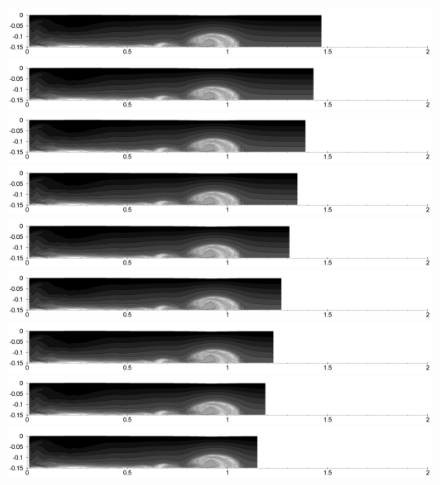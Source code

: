 \begin{figure}[htbp]
  \begin{center}    \includegraphics[scale=0.35]{../figures/Exp3-CASE1-dt0.005/rec_2_buf_24_sub_10/D2-101.pdf}
\includegraphics[scale=0.35]{../figures/Exp3-CASE1-dt0.005/rec_2_buf_24_sub_10/D2-102.pdf}    \includegraphics[scale=0.35]{../figures/Exp3-CASE1-dt0.005/rec_2_buf_24_sub_10/D2-103.pdf}
\includegraphics[scale=0.35]{../figures/Exp3-CASE1-dt0.005/rec_2_buf_24_sub_10/D2-104.pdf}    \includegraphics[scale=0.35]{../figures/Exp3-CASE1-dt0.005/rec_2_buf_24_sub_10/D2-105.pdf}
\includegraphics[scale=0.35]{../figures/Exp3-CASE1-dt0.005/rec_2_buf_24_sub_10/D2-106.pdf}    \includegraphics[scale=0.35]{../figures/Exp3-CASE1-dt0.005/rec_2_buf_24_sub_10/D2-107.pdf}
\includegraphics[scale=0.35]{../figures/Exp3-CASE1-dt0.005/rec_2_buf_24_sub_10/D2-108.pdf}    \includegraphics[scale=0.35]{../figures/Exp3-CASE1-dt0.005/rec_2_buf_24_sub_10/D2-109.pdf}

\end{center}
\end{figure}
